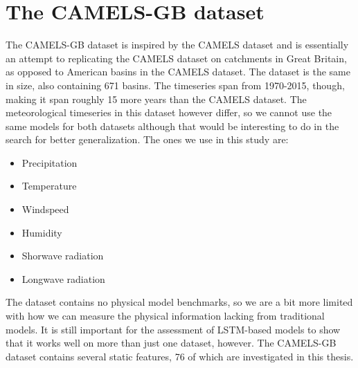 \section{The CAMELS-GB dataset}
The CAMELS-GB dataset \cite{CAMELS_GB} is inspired by the CAMELS dataset and is 
essentially an attempt to replicating the CAMELS dataset on catchments in Great Britain, 
as opposed to American basins in the CAMELS dataset. The dataset is the same in size,
also containing 671 basins. The timeseries span from 1970-2015, though, making 
it span roughly 15 more years than the CAMELS dataset.
 The meteorological timeseries 
in this dataset however differ, so we cannot use the same models for both datasets
although that would be interesting to do in the search for better generalization.
The ones we use in this study are:
\begin{itemize}
    \item Precipitation
    \item Temperature
    \item Windspeed
    \item Humidity
    \item Shorwave radiation
    \item Longwave radiation
\end{itemize}
The dataset contains no physical model benchmarks, so we are a bit more limited 
with how we can measure the physical information lacking from traditional models.
It is still important for the assessment of LSTM-based models to show that it works
well on more than just one dataset, however. 
The CAMELS-GB dataset contains several static features, 76 of which are investigated
in this thesis.

